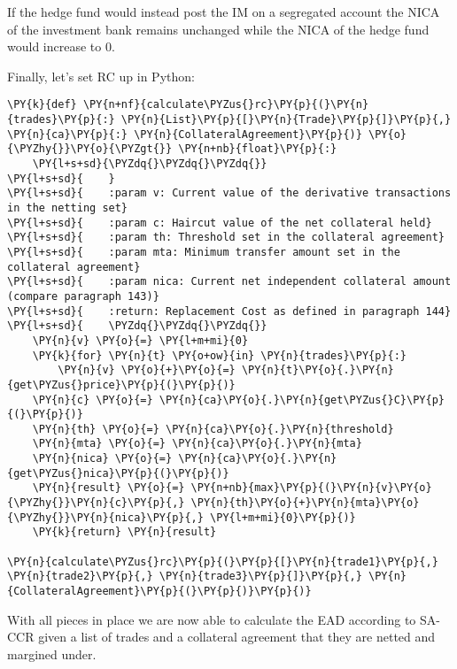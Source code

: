 If the hedge fund would instead post the IM on a segregated account the
NICA of the investment bank remains unchanged while the NICA of the
hedge fund would increase to 0.

    Finally, let's set RC up in Python:

    \begin{tcolorbox}[breakable, size=fbox, boxrule=1pt, pad at break*=1mm,colback=cellbackground, colframe=cellborder]
\begin{Verbatim}[commandchars=\\\{\}]
\PY{k}{def} \PY{n+nf}{calculate\PYZus{}rc}\PY{p}{(}\PY{n}{trades}\PY{p}{:} \PY{n}{List}\PY{p}{[}\PY{n}{Trade}\PY{p}{]}\PY{p}{,} \PY{n}{ca}\PY{p}{:} \PY{n}{CollateralAgreement}\PY{p}{)} \PY{o}{\PYZhy{}}\PY{o}{\PYZgt{}} \PY{n+nb}{float}\PY{p}{:}
    \PY{l+s+sd}{\PYZdq{}\PYZdq{}\PYZdq{}}
\PY{l+s+sd}{    }
\PY{l+s+sd}{    :param v: Current value of the derivative transactions in the netting set}
\PY{l+s+sd}{    :param c: Haircut value of the net collateral held}
\PY{l+s+sd}{    :param th: Threshold set in the collateral agreement}
\PY{l+s+sd}{    :param mta: Minimum transfer amount set in the collateral agreement}
\PY{l+s+sd}{    :param nica: Current net independent collateral amount (compare paragraph 143)}
\PY{l+s+sd}{    :return: Replacement Cost as defined in paragraph 144}
\PY{l+s+sd}{    \PYZdq{}\PYZdq{}\PYZdq{}}
    \PY{n}{v} \PY{o}{=} \PY{l+m+mi}{0}
    \PY{k}{for} \PY{n}{t} \PY{o+ow}{in} \PY{n}{trades}\PY{p}{:}
        \PY{n}{v} \PY{o}{+}\PY{o}{=} \PY{n}{t}\PY{o}{.}\PY{n}{get\PYZus{}price}\PY{p}{(}\PY{p}{)}
    \PY{n}{c} \PY{o}{=} \PY{n}{ca}\PY{o}{.}\PY{n}{get\PYZus{}C}\PY{p}{(}\PY{p}{)}
    \PY{n}{th} \PY{o}{=} \PY{n}{ca}\PY{o}{.}\PY{n}{threshold}
    \PY{n}{mta} \PY{o}{=} \PY{n}{ca}\PY{o}{.}\PY{n}{mta}
    \PY{n}{nica} \PY{o}{=} \PY{n}{ca}\PY{o}{.}\PY{n}{get\PYZus{}nica}\PY{p}{(}\PY{p}{)}
    \PY{n}{result} \PY{o}{=} \PY{n+nb}{max}\PY{p}{(}\PY{n}{v}\PY{o}{\PYZhy{}}\PY{n}{c}\PY{p}{,} \PY{n}{th}\PY{o}{+}\PY{n}{mta}\PY{o}{\PYZhy{}}\PY{n}{nica}\PY{p}{,} \PY{l+m+mi}{0}\PY{p}{)}
    \PY{k}{return} \PY{n}{result}

\PY{n}{calculate\PYZus{}rc}\PY{p}{(}\PY{p}{[}\PY{n}{trade1}\PY{p}{,} \PY{n}{trade2}\PY{p}{,} \PY{n}{trade3}\PY{p}{]}\PY{p}{,} \PY{n}{CollateralAgreement}\PY{p}{(}\PY{p}{)}\PY{p}{)}
\end{Verbatim}
\end{tcolorbox}

    With all pieces in place we are now able to calculate the EAD according
to SA-CCR given a list of trades and a collateral agreement that they
are netted and margined under.

